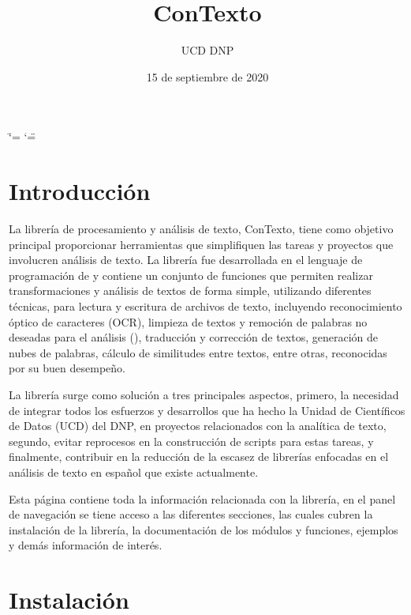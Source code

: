 \documentclass[letterpaper,10pt,openany,spanish]{sphinxmanual}
\title{ConTexto}
\date{15 de septiembre de 2020}
\author{UCD \sphinxhyphen{} DNP}
\begin{document}
\ifdefined\shorthandoff
  \ifnum\catcode`\=\string=\active\shorthandoff{=}\fi
  \ifnum\catcode`\"=\active{}\fi
\fi

\pagestyle{empty}
\sphinxmaketitle
\pagestyle{plain}
\sphinxtableofcontents
\pagestyle{normal}
\label{\detokenize{index::doc}}



\chapter{Introducción}
\label{\detokenize{seccion_introduccion:introduccion}}\label{\detokenize{seccion_introduccion:seccion-introduccion}}\label{\detokenize{seccion_introduccion::doc}}
La librería de procesamiento y análisis de texto, ConTexto, tiene como objetivo principal proporcionar herramientas que simplifiquen las tareas y proyectos que involucren análisis de texto. La librería fue desarrollada en el lenguaje de programación de  y contiene un conjunto de funciones que permiten realizar transformaciones y análisis de textos de forma simple, utilizando diferentes técnicas, para lectura y escritura de archivos de texto, incluyendo reconocimiento óptico de caracteres (OCR), limpieza de textos y remoción de palabras no deseadas para el análisis (), traducción y corrección de textos, generación de nubes de palabras, cálculo de similitudes entre textos, entre otras, reconocidas por su buen desempeño.

La librería surge como solución a tres principales aspectos, primero, la necesidad de integrar todos los esfuerzos y desarrollos que ha hecho la Unidad de Científicos de Datos (UCD) del DNP, en proyectos relacionados con la analítica de texto, segundo, evitar reprocesos en la construcción de scripts para estas tareas, y finalmente, contribuir en la reducción de la escasez de librerías enfocadas en el análisis de texto en español que existe actualmente.

Esta página contiene toda la información relacionada con la librería, en el panel de navegación se tiene acceso a las diferentes secciones, las cuales cubren la instalación de la librería, la documentación de los módulos y funciones, ejemplos y demás información de interés.


\chapter{Instalación}
\label{\detokenize{seccion_instalacion:instalacion}}\label{\detokenize{seccion_instalacion:seccion-instalacion}}\label{\detokenize{seccion_instalacion::doc}}
\end{document}

